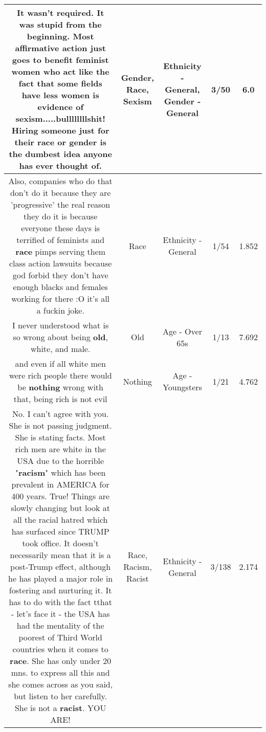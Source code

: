 \documentclass[11pt]{article}
\newlength\mylength
\begin{document}
\begin{center}
\begin{longtable}{|C{.65\mylength}|C{.30\mylength}|C{.12\mylength}|C{.12\mylength}|C{.12\mylength}|}
  \small It wasn't required.  It was stupid from the beginning.  Most affirmative action just goes to benefit feminist women who act like the fact that some fields have less women is evidence of \textbf{sexism}.....bullllllllshit! Hiring someone just for their \textbf{race} or \textbf{gender} is the dumbest idea anyone has ever thought of.\normalsize   & Gender, Race, Sexism & Ethnicity - General, Gender - General & 3/50 & 6.0 \\  \hline
  \small Also, companies who do that don't do it because they are 'progressive' the real reason they do it is because everyone these days is terrified of feminists and \textbf{race} pimps serving them class action lawsuits because god forbid they don't have enough blacks and females working for there :O it's all a fuckin joke.\normalsize   & Race & Ethnicity - General & 1/54 & 1.852 \\  \hline
  \small I never understood what is so wrong about being \textbf{old}, white, and male.\normalsize   & Old & Age - Over 65s & 1/13 & 7.692 \\  \hline
  \small and even if all white men were rich people there would be \textbf{nothing} wrong with that, being rich is not evil\normalsize   & Nothing & Age - Youngsters & 1/21 & 4.762 \\  \hline
  \small No.  I can't agree with you.  She is not passing judgment.  She is stating facts.  Most rich men are white in the USA due to the horrible "\textbf{racism}" which has been prevalent in AMERICA for 400 years.  True!  Things are slowly changing but look at all the racial hatred which has surfaced since TRUMP took office.  It doesn't necessarily mean that it is a post-Trump effect, although he has played a major role in fostering and nurturing it.  It has to do with the fact tthat - let's face it - the USA has had the mentality of the poorest of Third World countries when it comes to \textbf{race}.  She has only under 20 mns. to express all this and she comes across as you said, but listen to her carefully.  She is not a \textbf{racist}.  YOU ARE!\normalsize   & Race, Racism, Racist & Ethnicity - General & 3/138 & 2.174 \\  \hline

\end{longtable}
\end{center}
\end{document}
